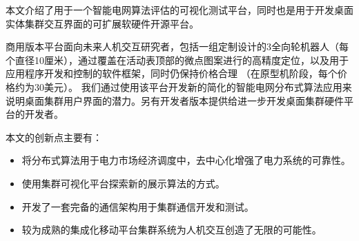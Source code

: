 \begin{cabstract}

  本文介绍了用于一个智能电网算法评估的可视化测试平台，同时也是用于开发桌面实体集群交互界面的可扩展软硬件开源平台。

  商用版本平台面向未来人机交互研究者，包括一组定制设计的3全向轮机器人（每个直径10厘米），通过覆盖在活动表顶部的微点图案进行的高精度定位，以及用于应用程序开发和控制的软件框架，同时仍保持价格合理 （在原型机阶段，每个价格约为30美元）。 我们通过使用该平台开发新的简化的智能电网分布式算法应用来说明桌面集群用户界面的潜力。另有开发者版本提供给进一步开发桌面集群硬件平台的开发者。



  本文的创新点主要有：

  \begin{itemize}
    \item 将分布式算法用于电力市场经济调度中，去中心化增强了电力系统的可靠性。
    \item 使用集群可视化平台探索新的展示算法的方式。
    \item 开发了一套完备的通信架构用于集群通信开发和测试。
    \item 较为成熟的集成化移动平台集群系统为人机交互创造了无限的可能性。
  \end{itemize}


\end{cabstract}


